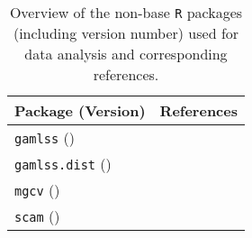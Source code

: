 \begin{table}[H]
  {\tabulinesep=2mm
    \begin{longtabu}{l L}
      \caption{Overview of the non-base \texttt{R} packages (including version number) used for data analysis and corresponding references.
        \label{tab:RPackagesReferences}} \\
      \toprule
      Package (Version) & References \\
      \midrule
      \endhead
      \bottomrule
      \endlastfoot
      \texttt{gamlss} (\gamlssPackageVersion{}) & \textcite{Rigby2005} \\
      \texttt{gamlss.dist} (\gamlssdistPackageVersion{}) & \textcite{Stasinopoulos2017} \\
      \texttt{mgcv} (\mgcvPackageVersion{}) & \textcite{Wood2016,Wood2003,Wood2011,Wood2004,Wood2017} \\
      \texttt{scam} (\scamPackageVersion{}) & \textcite{Pya2017} \\
      \bottomrule
    \end{longtabu}}
\end{table}


